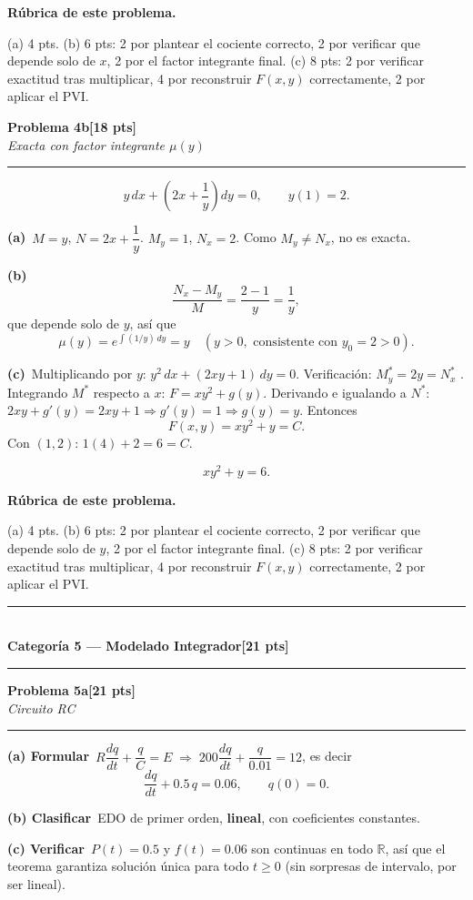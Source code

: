 \documentclass[11pt,letterpaper]{article}
\newcommand{\categoria}[3]{%
  \bigskip\bigskip\noindent
  \rule{\linewidth}{0.8pt}\\[2pt]
  {\Large\bfseries Categoría #1 --- #2}\hfill\textbf{[#3 pts]}\\[2pt]
  \rule{\linewidth}{0.8pt}\vspace{4pt}
}
\newcommand{\problema}[3]{%
  \bigskip\noindent
  {\large\textbf{Problema #1}}\hfill\textbf{[#2 pts]}\\[3pt]
  {\small\itshape #3}\par
  \vspace{2pt}\hrule\vspace{8pt}
}
\newcommand{\subparte}[2]{%
  \medskip\noindent\textbf{(#1}\ #2\par\smallskip
}
\newenvironment{resultado}
  {\begin{mdframed}[linecolor=black,linewidth=0.6pt,
    innerleftmargin=6pt,innerrightmargin=6pt,innertopmargin=4pt,innerbottommargin=4pt]
   \bfseries}
  {\end{mdframed}}
\newenvironment{rubrica}{%
  \begin{mdframed}[linecolor=black,linewidth=0.6pt,
    innerleftmargin=8pt,innerrightmargin=8pt,innertopmargin=5pt,innerbottommargin=5pt]
  \small\textbf{Rúbrica de este problema.}\par\smallskip
}{\end{mdframed}}
\begin{document}
\begin{rubrica}
(a) 4 pts. (b) 6 pts: 2 por plantear el cociente correcto, 2 por verificar que depende solo de $x$, 2 por el factor integrante final. (c) 8 pts: 2 por verificar exactitud tras multiplicar, 4 por reconstruir $F(x,y)$ correctamente, 2 por aplicar el PVI.
\end{rubrica}

\problema{4b}{18}{Exacta con factor integrante $\mu(y)$}

\[
y\,dx+\left(2x+\frac1y\right)dy=0, \qquad y(1)=2.
\]

\subparte{a)}{$M=y$, $N=2x+\dfrac1y$. $M_y=1$, $N_x=2$. Como $M_y\neq N_x$, no es exacta.}

\subparte{b)}{
\[
\frac{N_x-M_y}{M} = \frac{2-1}{y} = \frac1y,
\]
que depende solo de $y$, así que
\[
\mu(y) = e^{\int (1/y)\,dy} = y \quad (y>0, \text{ consistente con } y_0=2>0).
\]}

\subparte{c)}{Multiplicando por $y$: $y^2\,dx+(2xy+1)\,dy=0$. Verificación: $M^*_y=2y=N^*_x$ \checkmark. Integrando $M^*$ respecto a $x$: $F=xy^2+g(y)$. Derivando e igualando a $N^*$: $2xy+g'(y)=2xy+1 \Rightarrow g'(y)=1 \Rightarrow g(y)=y$. Entonces
\[
F(x,y) = xy^2+y = C.
\]
Con $(1,2)$: $1(4)+2=6=C$.
\begin{resultado}
\[
xy^2+y = 6.
\]
\end{resultado}}

\begin{rubrica}
(a) 4 pts. (b) 6 pts: 2 por plantear el cociente correcto, 2 por verificar que depende solo de $y$, 2 por el factor integrante final. (c) 8 pts: 2 por verificar exactitud tras multiplicar, 4 por reconstruir $F(x,y)$ correctamente, 2 por aplicar el PVI.
\end{rubrica}

\newpage
\categoria{5}{Modelado Integrador}{21}

\problema{5a}{21}{Circuito RC}

\subparte{a) Formular}{$R\dfrac{dq}{dt}+\dfrac{q}{C}=E \;\Rightarrow\; 200\dfrac{dq}{dt}+\dfrac{q}{0.01}=12$, es decir
\[
\frac{dq}{dt}+0.5\,q = 0.06, \qquad q(0)=0.
\]}

\subparte{b) Clasificar}{EDO de primer orden, \textbf{lineal}, con coeficientes constantes.}

\subparte{c) Verificar}{$P(t)=0.5$ y $f(t)=0.06$ son continuas en todo $\mathbb{R}$, así que el teorema garantiza solución única para todo $t\ge0$ (sin sorpresas de intervalo, por ser lineal).}
\end{document}
